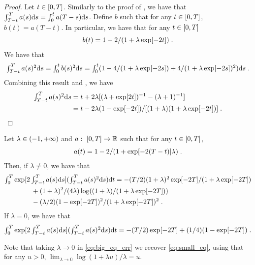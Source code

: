   \begin{proof}
    Let $t \in \left[0,T\right]$. Similarly to the proof of
    , we have that
    $\int_{T-t}^T a(s) \mathrm{d} s = \int_0^{t} a(T-s) \mathrm{d} s$.  Define $b$ such that
    for any $t \in \left[0,T\right]$, $b(t) = a (T-t)$. In particular, we have that
    for any $t \in \left[0,T\right]$
    \begin{equation}
      b(t) = 1 - 2 / (1 +\lambda \exp[-2t]) \; . 
    \end{equation}
    We have that
    \begin{equation}
      \textstyle{\int_{T-t}^Ta(s)^2 \mathrm{d}s = \int_0^t b(s)^2 \mathrm{d}s  = \int_0^t (1 - 4/(1 + \lambda \exp[-2s]) + 4/(1 + \lambda \exp[-2s])^2) \mathrm{d}s  \;. }
    \end{equation}
    Combining this result and , we have
  \begin{align}
    \textstyle{\int_{T-t}^T a(s)^2 \mathrm{d}s} &= t + 2\lambda [(\lambda + \exp[2t])^{-1} - (\lambda + 1)^{-1} ] \\
    &= t - 2\lambda(1 - \exp[-2t]) / [(1 + \lambda)(1 + \lambda \exp[-2t])] \; . 
  \end{align}    
    \end{proof}

    \begin{lemma}
      \label{lemma:hola_carre}
  Let $\lambda \in \left(-1, +\infty\right)$ and $a: \ \left[0,T\right] \to \mathbb{R}$ such
  that for any $t \in \left[0,T\right]$,
  \begin{equation}
    a(t) = 1 - 2/(1 + \exp[-2(T-t)]\lambda) \; . 
  \end{equation}
  Then, if $\lambda \neq 0$, we have that 
  \begin{align}
    &\textstyle{\int_0^T \exp[2\int_{T-t}^T a(s) \mathrm{d}s] (\int_{T-t}^T a(s)^2 \mathrm{d}s) \mathrm{d}t} = - (T/2)(1+\lambda)^2\exp[-2T]/(1+\lambda\exp[-2T]) \\
                                                                                             & \qquad \qquad + (1+\lambda)^2/(4\lambda)\log((1+\lambda)/(1 + \lambda \exp[-2T])) \\
    & \qquad \qquad -(\lambda/2)(1-\exp[-2T])^2/(1 + \lambda \exp[-2T])^2 \; . \label{eq:big_eq_err}
  \end{align}
  If $\lambda = 0$, we have that
  \begin{equation}
    \textstyle{\int_0^T \exp[2\int_{T-t}^T a(s) \mathrm{d}s] (\int_{T-t}^T a(s)^2 \mathrm{d}s) \mathrm{d}t} = -(T/2) \exp[-2T] + (1/4)(1 - \exp[-2T]) \; . \label{eq:small_eq}
  \end{equation}
\end{lemma}
Note that taking $\lambda \to 0$ in \eqref{eq:big_eq_err} we recover
\eqref{eq:small_eq}, using that for any $u > 0$,
$\lim_{\lambda \to 0} \log(1 + \lambda u)/\lambda = u$.

